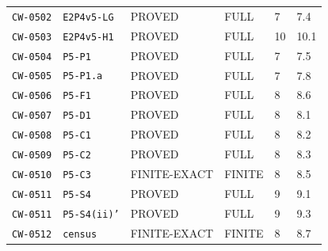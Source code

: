\begin{center}
\begin{tabular}{@{}llllll@{}}
\texttt{CW-0502} & \texttt{E2P4v5-LG} & PROVED & FULL & 7 & 7.4\\
\texttt{CW-0503} & \texttt{E2P4v5-H1} & PROVED & FULL & 10 & 10.1\\
\texttt{CW-0504} & \texttt{P5-P1} & PROVED & FULL & 7 & 7.5\\
\texttt{CW-0505} & \texttt{P5-P1.a} & PROVED & FULL & 7 & 7.8\\
\texttt{CW-0506} & \texttt{P5-F1} & PROVED & FULL & 8 & 8.6\\
\texttt{CW-0507} & \texttt{P5-D1} & PROVED & FULL & 8 & 8.1\\
\texttt{CW-0508} & \texttt{P5-C1} & PROVED & FULL & 8 & 8.2\\
\texttt{CW-0509} & \texttt{P5-C2} & PROVED & FULL & 8 & 8.3\\
\texttt{CW-0510} & \texttt{P5-C3} & FINITE-EXACT & FINITE & 8 & 8.5\\
\texttt{CW-0511} & \texttt{P5-S4} & PROVED & FULL & 9 & 9.1\\
\texttt{CW-0511} & \texttt{P5-S4(ii)'} & PROVED & FULL & 9 & 9.3\\
\texttt{CW-0512} & \texttt{census} & FINITE-EXACT & FINITE & 8 & 8.7\\
\bottomrule\end{tabular}
\end{center}
